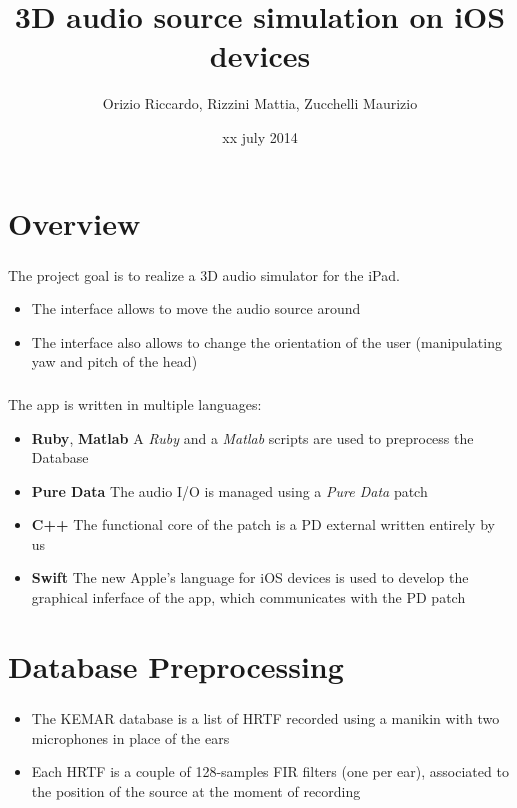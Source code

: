 \documentclass{beamer}
\title{3D audio source simulation on iOS devices}
\author[Orizio, Rizzini, Zucchelli]{Orizio Riccardo, Rizzini Mattia, Zucchelli Maurizio}
\date{xx july 2014}
\institute[UniBS]{University of Brescia}
\begin{document}
	\begin{frame}
		\maketitle
	\end{frame}

	\section{Overview}
	
	\begin{frame}
		\frametitle{\insertsection}
		The project goal is to realize a 3D audio simulator for the iPad.
		\begin{itemize}
			\item The interface allows to move the audio source around
			\item The interface also allows to change the orientation of the user (manipulating yaw
				and pitch of the head)
		\end{itemize}
	\end{frame}

	\begin{frame}
		\frametitle{\insertsection}
		The app is written in multiple languages:
		\begin{itemize}
			\item {\bf Ruby}, {\bf Matlab} A {\em Ruby} and a {\em Matlab} scripts are used to 
				preprocess the Database
			\item {\bf Pure Data} The audio I/O is managed using a {\em Pure Data} patch
			\item {\bf C++} The functional core of the patch is a PD external written entirely
				by us
			\item {\bf Swift} The new Apple's language for iOS devices is used to develop the
				graphical inferface of the app, which communicates with the PD patch
		\end{itemize}
	\end{frame}

	\AtBeginSection[]
	{
		\begin{frame}
			\frametitle{Outline}
			\tableofcontents[currentsection]
		\end{frame}
	}

	\section{Database Preprocessing}

	\begin{frame}
		\frametitle{\insertsection}
		\begin{itemize}
			\item The KEMAR database is a list of HRTF recorded using a manikin with two
				microphones in place of the ears
			\item Each HRTF is a couple of 128-samples FIR filters (one per ear), associated to the position
				of the source at the moment of recording
		\end{itemize}
	\end{frame}
\end{document}
